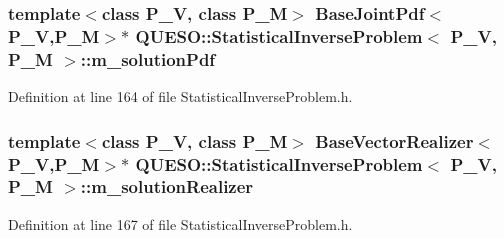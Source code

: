 \hypertarget{class_q_u_e_s_o_1_1_statistical_inverse_problem_a6ea67d31e6651f1dd4aa6983d4a01865}{
\subsubsection[{m\-\_\-solution\-Pdf}]{\setlength{\rightskip}{0pt plus 5cm}template$<$class P\-\_\-\-V, class P\-\_\-\-M$>$ {\bf Base\-Joint\-Pdf}$<$P\-\_\-\-V,P\-\_\-\-M$>$$\ast$ {\bf Q\-U\-E\-S\-O\-::\-Statistical\-Inverse\-Problem}$<$ P\-\_\-\-V, P\-\_\-\-M $>$\-::m\-\_\-solution\-Pdf\hspace{0.3cm}{\ttfamily [private]}}}\label{class_q_u_e_s_o_1_1_statistical_inverse_problem_a6ea67d31e6651f1dd4aa6983d4a01865}


Definition at line 164 of file Statistical\-Inverse\-Problem.\-h.

\hypertarget{class_q_u_e_s_o_1_1_statistical_inverse_problem_a4ac9fdff2472ae289fcf1413d210e38e}{
\subsubsection[{m\-\_\-solution\-Realizer}]{\setlength{\rightskip}{0pt plus 5cm}template$<$class P\-\_\-\-V, class P\-\_\-\-M$>$ {\bf Base\-Vector\-Realizer}$<$P\-\_\-\-V,P\-\_\-\-M$>$$\ast$ {\bf Q\-U\-E\-S\-O\-::\-Statistical\-Inverse\-Problem}$<$ P\-\_\-\-V, P\-\_\-\-M $>$\-::m\-\_\-solution\-Realizer\hspace{0.3cm}{\ttfamily [private]}}}\label{class_q_u_e_s_o_1_1_statistical_inverse_problem_a4ac9fdff2472ae289fcf1413d210e38e}


Definition at line 167 of file Statistical\-Inverse\-Problem.\-h.

